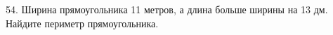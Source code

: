 54. Ширина прямоугольника 11 метров, а длина больше ширины на 13 дм. Найдите периметр прямоугольника.\\
